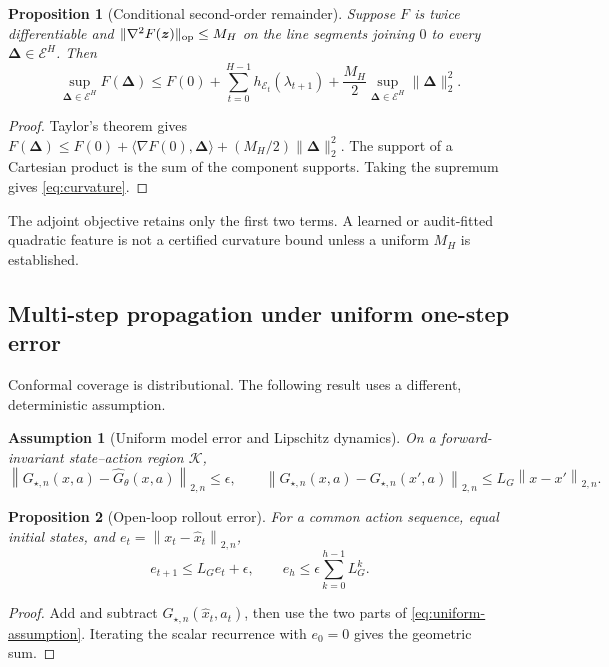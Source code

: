 \documentclass[10pt]{article}
\newtheorem{proposition}{Proposition}
\newtheorem{assumption}{Assumption}
\newcommand{\normn}[1]{\left\lVert #1\right\rVert_{2,n}}
\begin{document}
\begin{proposition}[Conditional second-order remainder]
Suppose $F$ is twice differentiable and
$\|\nabla^2F(\bm z)\|_{\rm op}\le M_H$ on the line segments joining
$0$ to every $\bm\Delta\in\mathcal E^H$. Then
\begin{equation}
\sup_{\bm\Delta\in\mathcal E^H}F(\bm\Delta)
\le F(0)+\sum_{t=0}^{H-1}h_{\mathcal E_t}(\lambda_{t+1})
+\frac{M_H}{2}\sup_{\bm\Delta\in\mathcal E^H}
\|\bm\Delta\|_2^2.
\label{eq:curvature}
\end{equation}
\end{proposition}
\begin{proof}
Taylor's theorem gives
$F(\bm\Delta)\le F(0)+\langle\nabla F(0),\bm\Delta\rangle+
(M_H/2)\|\bm\Delta\|_2^2$. The support of a Cartesian product is the sum of
the component supports. Taking the supremum gives
\cref{eq:curvature}.
\end{proof}
The adjoint objective retains only the first two terms. A learned or
audit-fitted quadratic feature is not a certified curvature bound unless a
uniform $M_H$ is established.

\subsection{Multi-step propagation under uniform one-step error}

Conformal coverage is distributional. The following result uses a different,
deterministic assumption.

\begin{assumption}[Uniform model error and Lipschitz dynamics]
On a forward-invariant state--action region $\mathcal K$,
\begin{equation}
\normn{G_{\star,n}(x,a)-\widehat G_\theta(x,a)}\le\epsilon,
\qquad
\normn{G_{\star,n}(x,a)-G_{\star,n}(x',a)}
\le L_G\normn{x-x'}.
\label{eq:uniform-assumption}
\end{equation}
\end{assumption}

\begin{proposition}[Open-loop rollout error]
For a common action sequence, equal initial states, and
$e_t=\normn{x_t-\widehat x_t}$,
\begin{equation}
e_{t+1}\le L_Ge_t+\epsilon,
\qquad
e_h\le\epsilon\sum_{k=0}^{h-1}L_G^k.
\label{eq:rollout-bound}
\end{equation}
\end{proposition}
\begin{proof}
Add and subtract $G_{\star,n}(\widehat x_t,a_t)$, then use the two parts of
\cref{eq:uniform-assumption}. Iterating the scalar recurrence with $e_0=0$
gives the geometric sum.
\end{proof}
\end{document}

